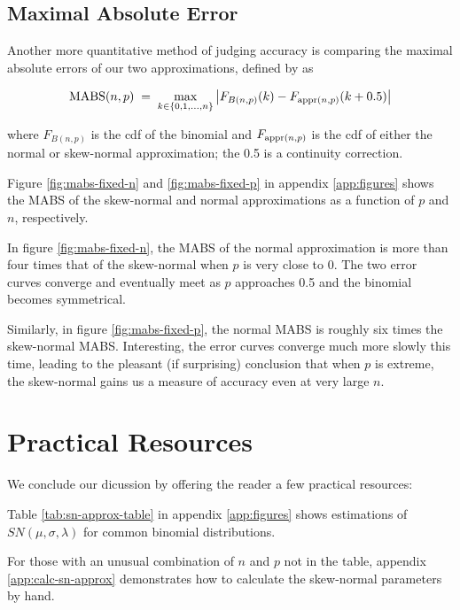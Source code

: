 \documentclass{article}
\begin{document}
\subsection{Maximal Absolute Error}
\label{subsec:mabs}

Another more quantitative method of judging accuracy is comparing the maximal
absolute errors of our two approximations, defined by \citet{mabs} as

\begin{equation}
  \textnormal{MABS}(n, p) \;=\; \max_{k \in \{0, 1,...,n\}} \left| F_{B(n,p)} (k) -  F_{\textnormal{appr}(n,p)}(k + 0.5) \right|
\end{equation}

where $F_{B(n,p)}$ is the cdf of the binomial and $F_{\textnormal{appr}(n,p)}$
is the cdf of either the normal or skew-normal approximation; the 0.5 is a
continuity correction.

Figure \ref{fig:mabs-fixed-n} and \ref{fig:mabs-fixed-p} in appendix
\ref{app:figures} shows the MABS of the skew-normal and normal approximations
as a function of $p$ and $n$, respectively.

In figure \ref{fig:mabs-fixed-n}, the MABS of the normal approximation is more
than four times that of the skew-normal when $p$ is very close to 0. The two
error curves converge and eventually meet as $p$ approaches 0.5 and the
binomial becomes symmetrical.

Similarly, in figure \ref{fig:mabs-fixed-p}, the normal MABS is roughly six
times the skew-normal MABS. Interesting, the error curves converge much more
slowly this time, leading to the pleasant (if surprising) conclusion that when
$p$ is extreme, the skew-normal gains us a measure of accuracy even at very
large $n$.

\section{Practical Resources}
\label{sec:resources}

We conclude our dicussion by offering the reader a few practical resources:

Table \ref{tab:sn-approx-table} in appendix \ref{app:figures} shows estimations
of $SN(\mu, \sigma, \lambda)$ for common binomial distributions.

For those with an unusual combination of $n$ and $p$ not in the table, appendix
\ref{app:calc-sn-approx} demonstrates how to calculate the skew-normal
parameters by hand.
\end{document}
